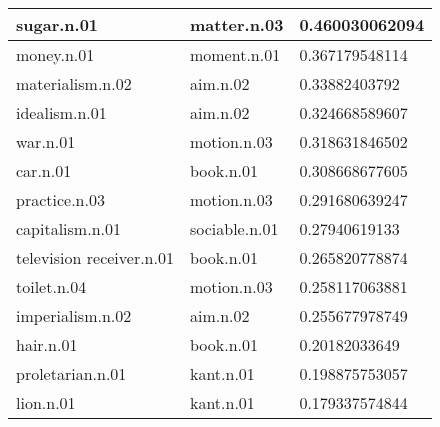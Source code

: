 \begin{center}
\begin{tabular}{ | l | l | l |}
sugar.n.01 & matter.n.03 & 0.460030062094\\ \hline
money.n.01 & moment.n.01 & 0.367179548114\\ \hline
materialism.n.02 & aim.n.02 & 0.33882403792\\ \hline
idealism.n.01 & aim.n.02 & 0.324668589607\\ \hline
war.n.01 & motion.n.03 & 0.318631846502\\ \hline
car.n.01 & book.n.01 & 0.308668677605\\ \hline
practice.n.03 & motion.n.03 & 0.291680639247\\ \hline
capitalism.n.01 & sociable.n.01 & 0.27940619133\\ \hline
television receiver.n.01 & book.n.01 & 0.265820778874\\ \hline
toilet.n.04 & motion.n.03 & 0.258117063881\\ \hline
imperialism.n.02 & aim.n.02 & 0.255677978749\\ \hline
hair.n.01 & book.n.01 & 0.20182033649\\ \hline
proletarian.n.01 & kant.n.01 & 0.198875753057\\ \hline
lion.n.01 & kant.n.01 & 0.179337574844\\ \hline
\end{tabular}
\end{center}